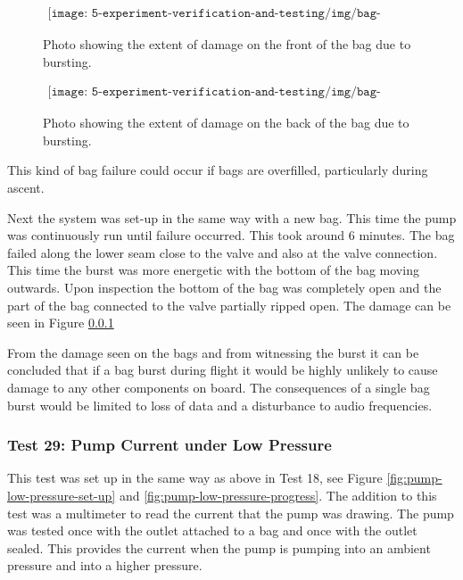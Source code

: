\begin{figure}[H]
    \begin{align*}
        \texttt{[image: 5-experiment-verification-and-testing/img/bag-burst-front.png]}
    \end{align*}
    \caption {Photo showing the extent of damage on the front of the bag due to bursting.} \label{fig:bag-burst-front}
\end{figure}

\begin{figure}[H]
    \begin{align*}
        \texttt{[image: 5-experiment-verification-and-testing/img/bag-burst-back.png]}
    \end{align*}
    \caption {Photo showing the extent of damage on the back of the bag due to bursting.} \label{fig:bag-burst-back}
\end{figure}

This kind of bag failure could occur if bags are overfilled, particularly during ascent.

Next the system was set-up in the same way with a new bag. This time the pump was continuously run until failure occurred. This took around 6 minutes. The bag failed along the lower seam close to the valve and also at the valve connection. This time the burst was more energetic with the bottom of the bag moving outwards. Upon inspection the bottom of the bag was completely open and the part of the bag connected to the valve partially ripped open. The damage can be seen in Figure \ref{}

From the damage seen on the bags and from witnessing the burst it can be concluded that if a bag burst during flight it would be highly unlikely to cause damage to any other components on board. The consequences of a single bag burst would be limited to loss of data and a disturbance to audio frequencies. 

\subsubsection{Test 29: Pump Current under Low Pressure}

This test was set up in the same way as above in Test 18, see Figure \ref{fig:pump-low-pressure-set-up} and \ref{fig:pump-low-pressure-progress}. The addition to this test was a multimeter to read the current that the pump was drawing. The pump was tested once with the outlet attached to a bag and once with the outlet sealed. This provides the current when the pump is pumping into an ambient pressure and into a higher pressure.


